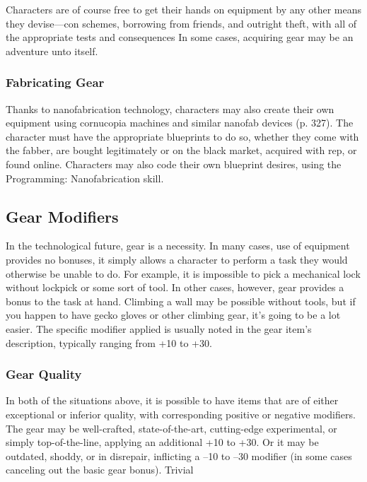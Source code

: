 Characters are of course free to get their hands 
on equipment by any other means they devise—con 
schemes, borrowing from friends, and outright 
theft, with all of the appropriate tests and consequences
In some cases, acquiring gear may be an
adventure unto itself.

\subsubsection{Fabricating Gear}

Thanks to nanofabrication technology, characters may 
also create their own equipment using cornucopia 
machines and similar nanofab devices (p. 327). The 
character must have the appropriate blueprints to do 
so, whether they come with the fabber, are bought 
legitimately or on the black market, acquired with rep, 
or found online. Characters may also code their own 
blueprint desires, using the Programming: Nanofabrication
skill.

\subsection{Gear Modifiers}

In the technological future, gear is a necessity. In many 
cases, use of equipment provides no bonuses, it simply 
allows a character to perform a task they would otherwise
be unable to do. For example, it is impossible
to pick a mechanical lock without lockpick or some 
sort of tool.
In other cases, however, gear provides a bonus to 
the task at hand. Climbing a wall may be possible 
without tools, but if you happen to have gecko gloves 
or other climbing gear, it's going to be a lot easier. The 
specific modifier applied is usually noted in the gear 
item's description, typically ranging from +10 to +30.

\subsubsection{Gear Quality}

In both of the situations above, it is possible to have 
items that are of either exceptional or inferior quality, 
with corresponding positive or negative modifiers. The 
gear may be well-crafted, state-of-the-art, cutting-edge 
experimental, or simply top-of-the-line, applying an 
additional +10 to +30. Or it may be outdated, shoddy, 
or in disrepair, inflicting a –10 to –30 modifier  (in 
some cases canceling out the basic gear bonus).
Trivial

